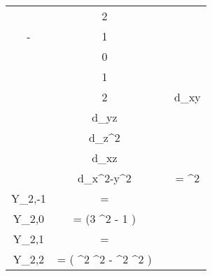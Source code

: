 \begin{longtable}{c|c|c|c}
\begin{minipage}{0.04\textwidth}
\[\begin{aligned}
			-&2\vphantom{\sqrt{\frac{15}{\pi}}} \\
			-&1\vphantom{\sqrt{\frac{15}{\pi}}} \\
	 		 &0\vphantom{\sqrt{\frac{15}{\pi}}} \\
	 		 &1\vphantom{\sqrt{\frac{15}{\pi}}} \\
	 		 &2\vphantom{\sqrt{\frac{15}{\pi}}}
		\end{aligned}
		\]
	\end{minipage}
	&
	\begin{minipage}{0.05\textwidth}
		\vspace*{-1.5ex}%
		\[
		\begin{aligned}
			&d_{xy}\vphantom{\sqrt{\frac{15}{\pi}}} \\
			&d_{yz}\vphantom{\sqrt{\frac{15}{\pi}}} \\
		 	&d_{z^2}\vphantom{\sqrt{\frac{15}{\pi}}} \\
		 	&d_{xz}\vphantom{\sqrt{\frac{15}{\pi}}} \\
		 	&d_{x^2-y^2}\vphantom{\sqrt{\frac{15}{\pi}}}
		\end{aligned}
		\]
	\end{minipage}
	&
	\begin{minipage}{0.6\textwidth}
		\vspace*{-1.5ex}%
		\[
		\begin{aligned}
			Y_{2,-2} &= \frac{1}{2} \sqrt{\frac{15}{\pi}} \cdot \sin^{2} \theta \cdot \sin \varphi \cdot \cos \varphi \\
			Y_{2,-1} &= \frac{1}{2} \sqrt{\frac{15}{\pi}} \cdot \sin \theta \cdot \sin \varphi \cdot \cos \theta \\
			Y_{2,0} &= \frac{1}{4} \sqrt{\frac{5}{\pi}} \cdot \left(3 \cos^2 \theta - 1 \right) \\
			Y_{2,1} &= \frac{1}{2} \sqrt{\frac{15}{\pi}} \cdot \sin \theta \cdot \cos \varphi \cdot \cos \theta \\
			Y_{2,2} &= \frac{1}{4} \sqrt{\frac{15}{\pi}} \cdot \left( \sin^{2} \theta \cdot \cos^{2} \varphi - \sin^{2} \theta \cdot \sin^{2} \varphi \right)
		\end{aligned}
		\]
	\end{minipage}
\end{longtable}
